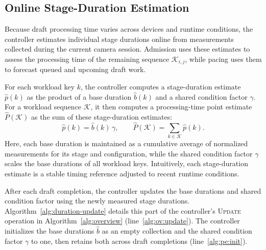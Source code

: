 \subsection{Online Stage-Duration Estimation}
\label{sec:model}

Because draft processing time varies across devices and runtime conditions, the controller estimates individual stage durations online from measurements collected during the current camera session.
Admission uses these estimates to assess the processing time of the remaining sequence \(\mathcal K_{i,j}\), while pacing uses them to forecast queued and upcoming draft work.

For each workload key \(k\), the controller computes a stage-duration estimate \(\hat p(k)\) as the product of a base duration \(\hat b(k)\) and a shared condition factor \(\gamma\).
For a workload sequence \(\mathcal K\), it then computes a processing-time point estimate \(\hat P(\mathcal K)\) as the sum of these stage-duration estimates:
\begin{equation*}
  \hat p(k)=\hat b(k)\,\gamma,
  \qquad
  \hat P(\mathcal{K})
  =\sum_{k\in\mathcal{K}}\hat p(k).
\end{equation*}
Here, each base duration is maintained as a cumulative average of normalized measurements for its stage and configuration, while the shared condition factor \(\gamma\) scales the base durations of all workload keys.
Intuitively, each stage-duration estimate is a stable timing reference adjusted to recent runtime conditions.



After each draft completion, the controller updates the base durations and shared condition factor using the newly measured stage durations.
Algorithm~\ref{alg:duration-update} details this part of the controller's \textsc{Update} operation in Algorithm~\ref{alg:overview} (line~\ref{alg:ov:update}).
The controller initializes the base durations \(\hat b\) as an empty collection and the shared condition factor \(\gamma\) to one, then retains both across draft completions (line~\ref{alg:pe:init}).

